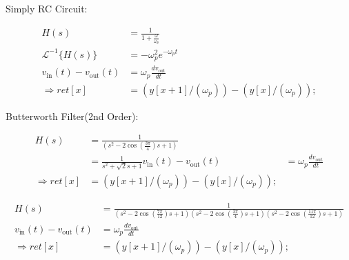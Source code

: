 \documentclass{article}
\begin{document}
\Huge
Simply RC Circuit:

\normalsize
\begin{equation}
    \begin{split}
        H(s) &= \frac{1}{1+\frac{\omega}{\omega_p}} \\
        \mathscr{L}^{-1} \{H(s)\} &= -\omega_p^2 e^{-\omega_p t} \\
        v_{\text{in}}(t)-v_{\text{out}}(t) &= \omega_p \frac{d v_{\text{out}}}{dt} \\
        \Rightarrow ret[x] &= (y[x+1]/(\omega_p)) - (y[x]/(\omega_p));
    \end{split}
\end{equation}

\Huge 
Butterworth Filter(2nd Order):


\normalsize

\begin{equation}
    \begin{split}
        H(s) &= \frac{1}{(s^2 - 2\cos (\frac{3\pi}{4})s + 1)} \\
        &= \frac{1}{s^2 + \sqrt{2} s + 1}
        v_{\text{in}}(t)-v_{\text{out}}(t) &= \omega_p \frac{d v_{\text{out}}}{dt} \\
        \Rightarrow ret[x] &= (y[x+1]/(\omega_p)) - (y[x]/(\omega_p));
    \end{split}
\end{equation}


\normalsize

\begin{equation}
    \begin{split}
        H(s) &= \frac{1}{(s^2 - 2\cos (\frac{7\pi}{12})s + 1)(s^2 - 2\cos (\frac{3\pi}{4})s + 1)(s^2 - 2\cos(\frac{11\pi}{12})s + 1)} \\
        v_{\text{in}}(t)-v_{\text{out}}(t) &= \omega_p \frac{d v_{\text{out}}}{dt} \\
        \Rightarrow ret[x] &= (y[x+1]/(\omega_p)) - (y[x]/(\omega_p));
    \end{split}
\end{equation}
\end{document}

